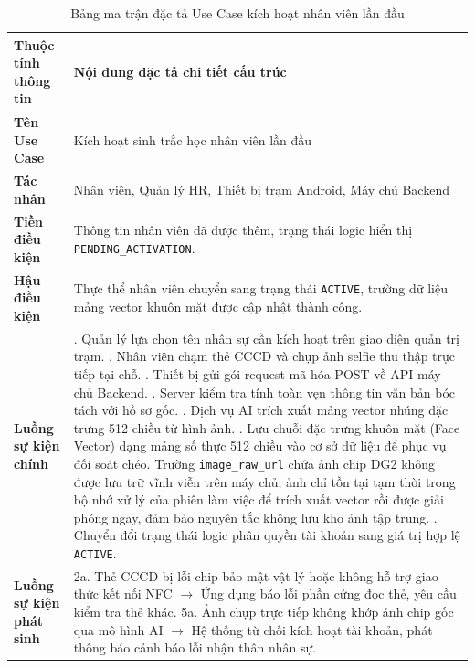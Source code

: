﻿\documentclass[../DoAn.tex]{subfiles}
\begin{document}
\begin{table}[ht!]
\centering
\small
\renewcommand{\arraystretch}{1.3}
\caption{Bảng ma trận đặc tả Use Case kích hoạt nhân viên lần đầu}
\label{tab:spec_activation}
\begin{tabular}{|>{\raggedright\arraybackslash}p{3.5cm}|>{\raggedright\arraybackslash}p{10.1cm}|}
\hline
\textbf{Thuộc tính thông tin} & \textbf{Nội dung đặc tả chi tiết cấu trúc} \\ \hline
\textbf{Tên Use Case} & Kích hoạt sinh trắc học nhân viên lần đầu \\ \hline
\textbf{Tác nhân} & Nhân viên, Quản lý HR, Thiết bị trạm Android, Máy chủ Backend \\ \hline
\textbf{Tiền điều kiện} & Thông tin nhân viên đã được thêm, trạng thái logic hiển thị \texttt{PENDING\_ACTIVATION}. \\ \hline
\textbf{Hậu điều kiện} & Thực thể nhân viên chuyển sang trạng thái \texttt{ACTIVE}, trường dữ liệu mảng vector khuôn mặt được cập nhật thành công. \\ \hline
\textbf{Luồng sự kiện chính} & 
1. Quản lý lựa chọn tên nhân sự cần kích hoạt trên giao diện quản trị trạm. \newline
2. Nhân viên chạm thẻ CCCD và chụp ảnh selfie thu thập trực tiếp tại chỗ. \newline
3. Thiết bị gửi gói request mã hóa POST về API máy chủ Backend. \newline
4. Server kiểm tra tính toàn vẹn thông tin văn bản bóc tách với hồ sơ gốc. \newline
5. Dịch vụ AI trích xuất mảng vector nhúng đặc trưng 512 chiều từ hình ảnh. \newline
6. Lưu chuỗi đặc trưng khuôn mặt (Face Vector) dạng mảng số thực 512 chiều vào cơ sở dữ liệu để phục vụ đối soát chéo. Trường \texttt{image\_raw\_url} chứa ảnh chip DG2 không được lưu trữ vĩnh viễn trên máy chủ; ảnh chỉ tồn tại tạm thời trong bộ nhớ xử lý của phiên làm việc để trích xuất vector rồi được giải phóng ngay, đảm bảo nguyên tắc không lưu kho ảnh tập trung. \newline
7. Chuyển đổi trạng thái logic phân quyền tài khoản sang giá trị hợp lệ \texttt{ACTIVE}. \\ \hline
\textbf{Luồng sự kiện phát sinh} & 
2a. Thẻ CCCD bị lỗi chip bảo mật vật lý hoặc không hỗ trợ giao thức kết nối NFC $\rightarrow$ Ứng dụng báo lỗi phần cứng đọc thẻ, yêu cầu kiểm tra thẻ khác. \newline
5a. Ảnh chụp trực tiếp không khớp ảnh chip gốc qua mô hình AI $\rightarrow$ Hệ thống từ chối kích hoạt tài khoản, phát thông báo cảnh báo lỗi nhận thân nhân sự. \\ \hline
\end{tabular}
\end{table}
\end{document}
